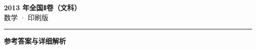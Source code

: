 \documentclass[zihao=5, a4paper]{ctexart}
\begin{document}
\begin{center}
  {\Large\bfseries 2013 年全国Ⅱ卷（文科）}\\[4pt]
  {\large 数学 · 印刷版}
\end{center}
\medskip
{}

\par\bigskip\hrule\bigskip
{}
\begin{center}{\large\bfseries 参考答案与详细解析}\end{center}
\smallskip

\end{document}
